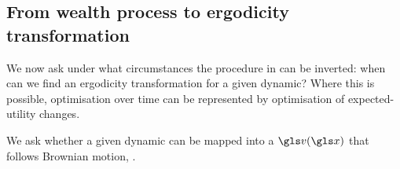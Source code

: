 \subsection{From wealth process to ergodicity transformation}
%
%
%
%



We now ask under what circumstances the procedure in
 can be inverted: when can we find an ergodicity transformation for a
given dynamic? Where this is possible, optimisation over time 
can be represented by optimisation of expected-utility changes.

We ask whether a given dynamic can be mapped into a $\gv(\x)$ 
that follows Brownian motion, .

